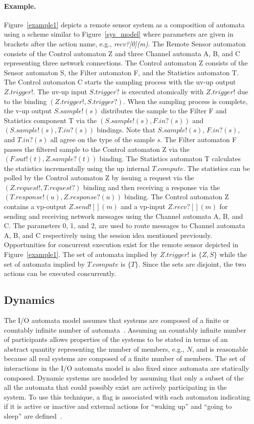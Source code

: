 \paragraph{Example.}
Figure~\ref{example1} depicts a remote sensor system as a composition of automata using a scheme similar to Figure~\ref{sys_model} where parameters are given in brackets after the action name, e.g., \emph{recv?[0](m)}.
The Remote Sensor automaton consists of the Control automaton Z and three Channel automata A, B, and C representing three network connections.
The Control automaton Z consists of the Sensor automaton S, the Filter automaton F, and the Statistics automaton T.
The Control automaton C starts the sampling process with the uv-up output $Z.trigger!$.
The uv-up input $S.trigger?$ is executed atomically with $Z.trigger!$ due to the binding $(Z.trigger!, S.trigger?)$.
When the sampling process is complete, the v-up output $S.sample!(s)$ distributes the sample to the Filter F and Statistics component T via the $(S.sample!(s), F.in?(s))$ and $(S.sample!(s), T.in?(s))$ bindings.
Note that $S.sample!(s)$, $F.in?(s)$, and $T.in?(s)$ all agree on the type of the sample $s$.
The Filter automaton F passes the filtered sample to the Control automaton Z via the $(F.out!(t), Z.sample?(t))$ binding.
The Statistics automaton T calculates the statistics incrementally using the up internal $T.compute$.
The statistics can be polled by the Control automaton Z by issuing a request via the $(Z.request!, T.request?)$ binding and then receiving a response via the $(T.response!(u), Z.response?(u))$ binding.
The Control automaton Z contains a vp-output $Z.send![](m)$ and a vp-input $Z.recv?[](m)$ for sending and receiving network messages using the Channel automata A, B, and C.
The parameters 0, 1, and 2, are used to route messages to Channel automata A, B, and C respectively using the session idea mentioned previously.
Opportunities for concurrent execution exist for the remote sensor depicted in Figure~\ref{example1}.
The set of automata implied by $Z.trigger!$ is $\{Z, S\}$ while the set of automata implied by $T.compute$ is $\{T\}$.
Since the sets are disjoint, the two actions can be executed concurrently.

\subsection{Dynamics\label{dynamics}}

The I/O automata model assumes that systems are composed of a finite or countably infinite number of automata~\cite{lynch1996distributed}.
Assuming an countably infinite number of participants allows properties of the systems to be stated in terms of an abstract quantity representing the number of members, e.g., $N$, and is reasonable because all real systems are composed of a finite number of members.
The set of interactions in the I/O automata model is also fixed since automata are statically composed.
Dynamic systems are modeled by assuming that only a subset of the all the automata that could possibly exist are actively participating in the system.
To use this technique, a flag is associated with each automaton indicating if it is active or inactive and external actions for ``waking up'' and ``going to sleep'' are defined~\cite{lynch1996distributed}.

